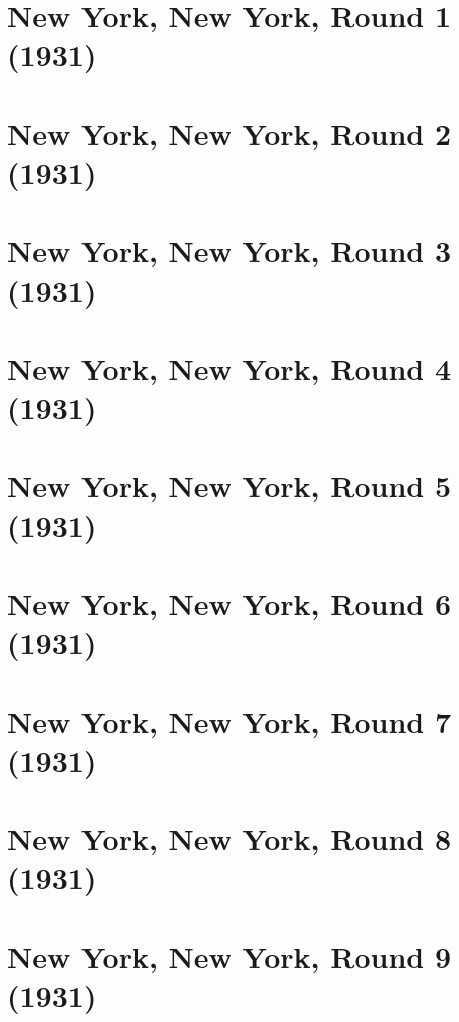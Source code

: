 \documentclass[11pt]{article}
\begin{document}
\section{New York, New York, Round 1 (1931)}


\clearpage

\section{New York, New York, Round 2 (1931)}


\clearpage

\section{New York, New York, Round 3 (1931)}


\clearpage

\section{New York, New York, Round 4 (1931)}


\clearpage

\section{New York, New York, Round 5 (1931)}


\clearpage

\section{New York, New York, Round 6 (1931)}


\clearpage

\section{New York, New York, Round 7 (1931)}


\clearpage

\section{New York, New York, Round 8 (1931)}


\clearpage

\section{New York, New York, Round 9 (1931)}

\end{document}
